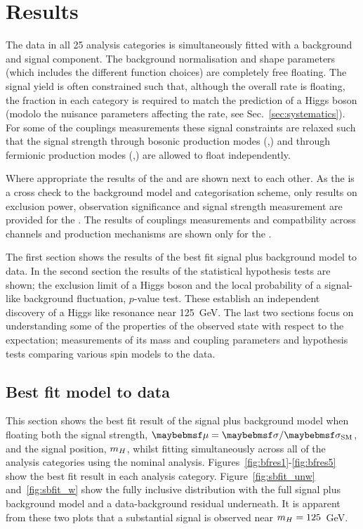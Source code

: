 \chapter{Results}
\label{chap:results}

The data in all 25 analysis categories is simultaneously fitted with a background and signal component. The background normalisation and shape parameters (which includes the different function choices) are completely free floating. The signal yield is often constrained such that, although the overall rate is floating, the fraction in each category is required to match the prediction of a \SM Higgs boson (modolo the nuisance parameters affecting the rate, see Sec.~\ref{sec:systematics}). For some of the couplings measurements these signal constraints are relaxed such that the signal strength through bosonic production modes (\VBF,\VH) and through fermionic production modes (\ggH,\ttH) are allowed to float independently. 

Where appropriate the results of the \MFM and \SMVA are shown next to each other. As the \SMVA is a cross check to the background model and categorisation scheme, only results on exclusion power, observation significance and signal strength measurement are provided for the \SMVA. The results of couplings measurements and compatbility across channels and production mechanisms are shown only for the \MFM.

The first section shows the results of the best fit signal plus background model to data. In the second section the results of the statistical hypothesis tests are shown; the exclusion limit of a \SM Higgs boson and the local probability of a signal-like background fluctuation, $p$-value test. These establish an independent discovery of a Higgs like resonance near 125~GeV. The last two sections focus on understanding some of the properties of the observed state with respect to the \SM expectation; measurements of its mass and coupling parameters and hypothesis tests comparing various spin models to the data.

\section{Best fit model to data}

This section shows the best fit result of the signal plus background model when floating both the signal strength, $\mu=\musm$, and the signal position, $m_{H}$, whilst fitting simultaneously across all of the analysis categories using the nominal \MFM analysis. Figures~\ref{fig:bfres1}-\ref{fig:bfres5} show the best fit result in each analysis category. Figure~\ref{fig:sbfit_unw} and~\ref{fig:sbfit_w} show the fully inclusive distribution with the full signal plus background model and a data-background residual underneath. It is apparent from these two plots that a substantial signal is observed near $m_{H}=125$~GeV.

